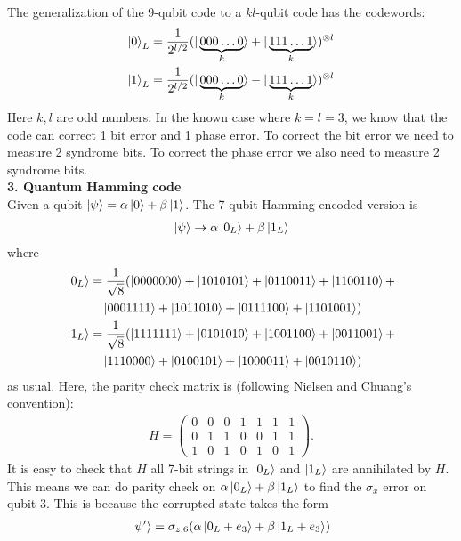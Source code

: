 \documentclass{article}
\theoremstyle{definition}
\newcommand{\al}{\alpha}
\newcommand{\be}{\beta}
\newcommand{\f}[2]{\frac{#1}{#2}}
\begin{document}
\noindent The generalization of the 9-qubit code to a $kl$-qubit code has the codewords:
\begin{align*}
	\ket{0}_L = \f{1}{2^{l/2}} ( |\underbrace{000\dots 0}_{k}\rangle + |\underbrace{111\dots 1}_{k}\rangle )^{\otimes l} \\
	\ket{1}_L = \f{1}{2^{l/2}} ( |\underbrace{000\dots 0}_{k}\rangle - |\underbrace{111\dots 1}_{k}\rangle )^{\otimes l}
\end{align*}
Here $k,l$ are odd numbers. In the known case where $k=l=3$, we know that the code can correct 1 bit error and 1 phase error. To correct the bit error we need to measure 2 syndrome bits. To correct the phase error we also need to  measure 2 syndrome bits. \\





\noindent \textbf{3. Quantum Hamming code}\\

\noindent Given a qubit $\ket{\psi} = \al\ket{0} + \be\ket{1}$. The 7-qubit Hamming encoded version is 
\begin{align*}
	\ket{\psi} \to \al\ket{0_L} + \be\ket{1_L}
\end{align*}
where 
\begin{align*}
	\ket{0_L} &= \f{1}{\sqrt{8}}(\ket{0000000} + \ket{1010101} + \ket{0110011} + \ket{1100110} + \\
	&\quad \ket{0001111}+ \ket{1011010} + \ket{0111100} + \ket{1101001}) \\
	\ket{1_L} &= \f{1}{\sqrt{8}}( \ket{1111111} + \ket{0101010} + \ket{1001100} + \ket{0011001} + \\
	&\quad \ket{1110000} + \ket{0100101} + \ket{1000011} + \ket{0010110})
\end{align*}
as usual. Here, the parity check matrix is (following Nielsen and Chuang's convention):
\begin{align*}
	H = \begin{pmatrix}
		0 & 0 & 0 & 1 & 1 & 1 & 1\\
		0 & 1 & 1 & 0 & 0 & 1 & 1\\
		1 & 0 & 1 & 0 & 1 & 0 & 1 
	\end{pmatrix}.
\end{align*}
It is easy to check that $H$ all 7-bit strings in $\ket{0_L}$ and $\ket{1_L}$ are annihilated by $H$. This means we can do parity check on $\al\ket{0_L} + \be\ket{1_L}$ to find the $\sigma_x$ error on qubit 3. This is because the corrupted state takes the form
\begin{align*}
	\ket{\psi'} = \sigma_{z,6} (\al \ket{0_L + e_3} + \be\ket{1_L+e_3})
\end{align*}
\end{document}
